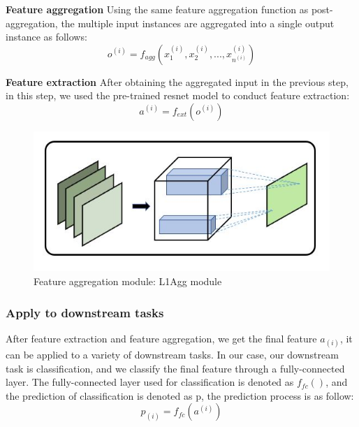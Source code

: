 \documentclass[10pt,twocolumn,letterpaper]{article}
\begin{document}
\textbf{Feature aggregation}
Using the same feature aggregation function as post-aggregation, the multiple input instances are aggregated into a single output instance as follows:
\begin{equation}
    o^{(i)} = f_{agg}(x^{(i)}_1, x^{(i)}_2, ..., x^{(i)}_{n^{(i)}})
\end{equation}

\textbf{Feature extraction}
After obtaining the aggregated input in the previous step, in this step, we used the pre-trained resnet model to conduct feature extraction:
\begin{equation}
    a^{(i)} = f_{ext}(o^{(i)})
\end{equation}

\begin{figure}[t]
\begin{center}
  \includegraphics[width=0.8\linewidth]{figure4.JPG}
\end{center}
   \caption{Feature aggregation module: L1Agg module}
\label{fig:long}
\label{fig:onecol}
\end{figure}

\subsubsection{Apply to downstream tasks}
After feature extraction and feature aggregation, we get the final feature $a_{(i)}$, it can be applied to a variety of downstream tasks. In our case, our downstream task is classification, and we classify the final feature through a fully-connected layer. The fully-connected layer used for classification is denoted as $f_{fc}()$, and the prediction of classification is denoted as p, the prediction process is as follow:
\begin{equation}
    p_{(i)} = f_{fc}(a^{(i)})
\end{equation}
\end{document}

